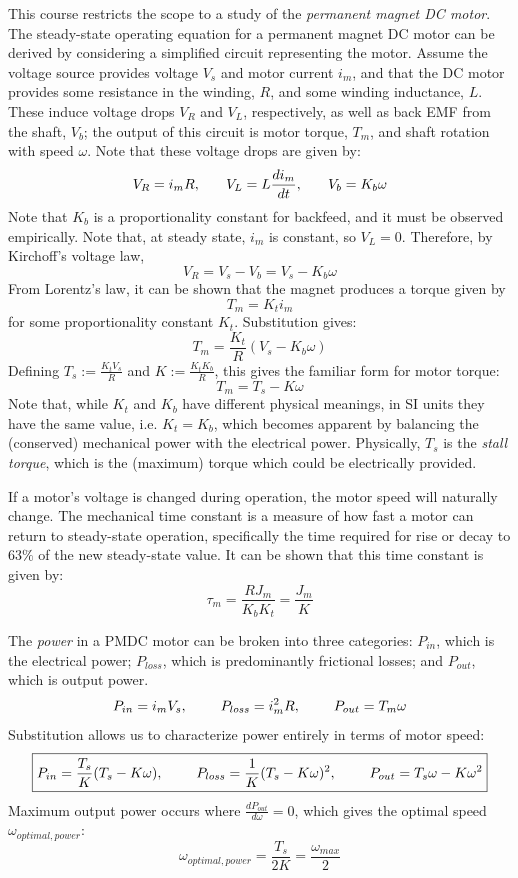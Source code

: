 This course restricts the scope to a study of the \textit{permanent magnet DC motor}. The steady-state operating equation for a permanent magnet DC motor can be derived by considering a simplified circuit representing the motor. Assume the voltage source provides voltage $V_s$ and motor current $i_m$, and that the DC motor provides some resistance in the winding, $R$, and some winding inductance, $L$. These induce voltage drops $V_R$ and $V_L$, respectively, as well as back EMF from the shaft, $V_b$; the output of this circuit is motor torque, $T_m$, and shaft rotation with speed $\omega$. Note that these voltage drops are given by: \[V_R = i_m R,\hspace{0.25in} V_L = L\frac{di_m}{dt},\hspace{0.25in} V_b = K_b\omega\] Note that $K_b$ is a proportionality constant for backfeed, and it must be observed empirically. Note that, at steady state, $i_m$ is constant, so $V_L=0$. Therefore, by Kirchoff's voltage law, \[V_R = V_s - V_b =V_s -K_b\omega\] From Lorentz's law, it can be shown that the magnet produces a torque given by \[T_m = K_t i_m\] for some proportionality constant $K_t$. Substitution gives: \[T_m = \frac{K_t}{R}(V_s - K_b\omega)\] Defining $T_s:=\frac{K_t V_s}{R}$ and $K:=\frac{K_tK_b}{R}$, this gives the familiar form for motor torque: \[\boxed{T_m = T_s - K\omega}\] Note that, while $K_t$ and $K_b$ have different physical meanings, in SI units they have the same value, i.e. $K_t=K_b$, which becomes apparent by balancing the (conserved) mechanical power with the electrical power. Physically, $T_s$ is the \textit{stall torque}, which is the (maximum) torque which could be electrically provided. 

If a motor's voltage is changed during operation, the motor speed will naturally change. The mechanical time constant is a measure of how fast a motor can return to steady-state operation, specifically the time required for rise or decay to $63\%$ of the new steady-state value. It can be shown that this time constant is given by: \[\tau_m = \frac{RJ_m}{K_bK_t} = \frac{J_m}{K}\]

The \textit{power} in a PMDC motor can be broken into three categories: $P_{in}$, which is the electrical power; $P_{loss}$, which is predominantly frictional losses; and $P_{out}$, which is output power. \[P_{in} = i_m V_s,\hspace{0.325in} P_{loss} = i_m^2 R,\hspace{0.325in} P_{out} = T_m\omega\] Substitution allows us to characterize power entirely in terms of motor speed: \[\boxed{P_{in} = \frac{T_s}{K} (T_s - K\omega),\hspace{0.325in} P_{loss} = \frac{1}{K}(T_s-K\omega)^2,\hspace{0.325in} P_{out} = T_s\omega - K\omega^2}\] Maximum output power occurs where $\frac{dP_{out}}{d\omega}=0$, which gives the optimal speed $\omega_{optimal,power}$: \[\boxed{\omega_{optimal,power} = \frac{T_s}{2K}  = \frac{\omega_{max}}{2}}\]

